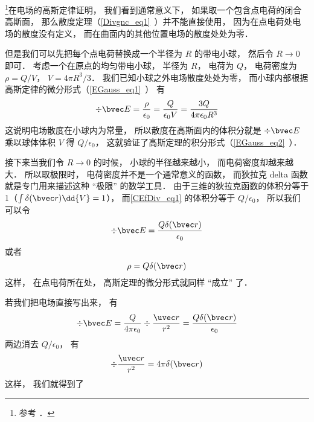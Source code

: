 
\begin{issues}
\issueDraft
\end{issues}


\footnote{参考 \cite{GriffE}．}在电场的高斯定律证明， 我们看到通常意义下， 如果取一个包含点电荷的闭合高斯面， 那么散度定理（\autoref{Divgnc_eq1}~）并不能直接使用， 因为在点电荷处电场的散度没有定义， 而在曲面内的其他位置电场的散度处处为零．

但是我们可以先把每个点电荷替换成一个半径为 $R$ 的带电小球， 然后令 $R\to 0$ 即可． 考虑一个在原点的均匀带电小球， 半径为 $R$， 电荷为 $Q$， 电荷密度为 $\rho = Q/V$， $V = 4\pi R^3/3$． 我们已知小球之外电场散度处处为零， 而小球内部根据高斯定律的微分形式（\autoref{EGauss_eq1}~） 有
\begin{equation}\label{CEfDiv_eq1}
\div \bvec E = \frac{\rho}{\epsilon_0} = \frac{Q}{\epsilon_0 V} = \frac{3Q}{4\pi \epsilon_0 R^3}
\end{equation}
这说明电场散度在小球内为常量， 所以散度在高斯面内的体积分就是 $\div \bvec E$ 乘以球体体积 $V$ 得 $Q/\epsilon_0$， 这就验证了高斯定理的积分形式（\autoref{EGauss_eq2}~）．

接下来当我们令 $R\to 0$ 的时候， 小球的半径越来越小， 而电荷密度却越来越大． 所以取极限时， 电荷密度并不是一个通常意义的函数， 而狄拉克 delta 函数就是专门用来描述这种 “极限” 的数学工具． 由于三维的狄拉克函数的体积分等于 1（$\int \delta(\bvec r)\dd{V} = 1$）， 而\autoref{CEfDiv_eq1} 的体积分等于 $Q/\epsilon_0$， 所以我们可以令
\begin{equation}
\div \bvec E = \frac{Q\delta(\bvec r)}{\epsilon_0}
\end{equation}
或者
\begin{equation}
\rho = Q\delta(\bvec r)
\end{equation}
这样， 在点电荷所在处， 高斯定理的微分形式就同样 “成立” 了．

若我们把电场直接写出来， 有
\begin{equation}
\div \bvec E = \frac{Q}{4\pi\epsilon_0}\div \frac{\uvec r}{r^2} = \frac{Q\delta(\bvec r)}{\epsilon_0}
\end{equation}
两边消去 $Q/\epsilon_0$， 有
\begin{equation}
\div \frac{\uvec r}{r^2} = 4\pi\delta(\bvec r)
\end{equation}
这样， 我们就得到了



